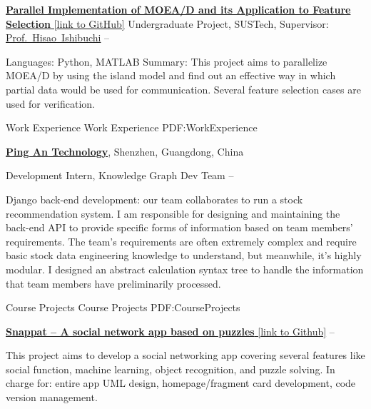 \documentclass[a4paper,MMMyyyy,nonstopmode]{simpleresumecv}
\begin{document}
\begin{Body}
    \Entry
    \href{https://github.com/hackroid/pMOEA-D}
    {\textbf{Parallel Implementation of MOEA/D and its Application to Feature Selection} [link to GitHub]}
    \BulletItem
    Undergraduate Project, SUSTech, Supervisor: \href{http://cse.sustech.edu.cn/faculty/~hisao/}{Prof.~Hisao~Ishibuchi}
    \hfill
     --
    \begin{Detail}
        \SubBulletItem
        Languages: Python, MATLAB
        \SubBulletItem
        Summary:
        This project aims to parallelize MOEA/D by using the island model and find out an effective way in which partial data would be used for communication. Several feature selection cases are used for verification.
    \end{Detail}



    \Section
    {Work\newline
        Experience}
    {Work Experience}
    {PDF:WorkExperience}

    \Entry
    \href{https://tech.pingan.com/}
    {\textbf{Ping An Technology}},
    Shenzhen, Guangdong, China

    \BulletItem
    Development Intern,
    Knowledge Graph Dev Team
    \hfill
     --
    \begin{Detail}
        \SubBulletItem
        Django back-end development: our team collaborates to run a stock recommendation system. I am responsible for designing and maintaining the back-end API to provide specific forms of information based on team members' requirements. The team's requirements are often extremely complex and require basic stock data engineering knowledge to understand, but meanwhile, it's highly modular. I designed an abstract calculation syntax tree to handle the information that team members have preliminarily processed.
    \end{Detail}



    \Section
    {Course \newline
        Projects}
    {Course Projects}
    {PDF:CourseProjects}

    \BulletItem
    \href{https://github.com/hackroid/snappat}{\textbf{Snappat -- A social network app based on puzzles} [link to Github]}
    \hfill
     --
    \begin{Detail}
        \SubBulletItem
        This project aims to develop a social networking app covering several features like social function, machine learning, object recognition, and puzzle solving.
        \SubBulletItem
        In charge for: entire app UML design, homepage/fragment card development, code version management.
    \end{Detail}


\end{Body}
\end{document}
